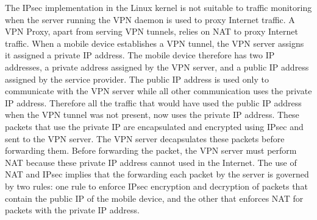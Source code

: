The IPsec implementation in the Linux kernel is not suitable to traffic monitoring when the server running the VPN daemon is used to proxy Internet traffic. 
A VPN Proxy, apart from serving VPN tunnels, relies on NAT to proxy Internet traffic. 
When a mobile device establishes a VPN tunnel, the VPN server assigns it assigned a private IP address. 
The mobile device therefore has two IP addresses, a private address assigned by the VPN server, and a public IP address assigned by the service provider. 
The public IP address is used only to communicate with the VPN server while all other communication uses the private IP address. 
Therefore all the traffic that would have used the public IP address when the VPN tunnel was not present, now uses the private IP address.  
These packets that use the private IP are encapsulated and encrypted using IPsec and sent to the VPN server. 
The VPN server decapsulates these packets before forwarding them. 
Before forwarding the packet, the VPN server must perform NAT because these private IP address cannot used in the Internet. 
The use of NAT and IPsec implies that the forwarding each packet by the server is governed by two rules: one rule to enforce IPsec encryption and decryption of packets that contain the public IP of the mobile device, and the other that enforces NAT for packets with the private IP address. 

